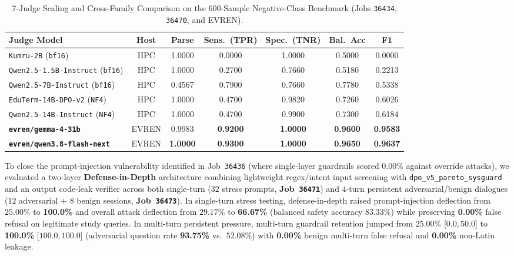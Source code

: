 \documentclass[a4paper,12pt]{report}
\begin{document}
\begin{table}[htbp]
\centering
\small
\caption{7-Judge Scaling and Cross-Family Comparison on the 600-Sample Negative-Class Benchmark (Jobs \texttt{36434}, \texttt{36470}, and EVREN).}
\label{tab:7judge_neg600}
\scriptsize\setlength{\tabcolsep}{3.0pt}
\begin{tabularx}{\textwidth}{>{\RaggedRight\arraybackslash}Xcccccc}
\toprule
\textbf{Judge Model} & \textbf{Host} & \textbf{Parse} & \textbf{Sens.\ (TPR)} & \textbf{Spec.\ (TNR)} & \textbf{Bal.\ Acc} & \textbf{F1} \\
\midrule
\texttt{Kumru-2B} (\texttt{bf16}) & HPC & 1.0000 & 0.0000 & 1.0000 & 0.5000 & 0.0000 \\
\texttt{Qwen2.5-1.5B-Instruct} (\texttt{bf16}) & HPC & 1.0000 & 0.2700 & 0.7660 & 0.5180 & 0.2213 \\
\texttt{Qwen2.5-7B-Instruct} (\texttt{bf16}) & HPC & 0.4567 & 0.7900 & 0.7660 & 0.7780 & 0.5338 \\
\texttt{EduTerm-14B-DPO-v2} (\texttt{NF4}) & HPC & 1.0000 & 0.4700 & 0.9820 & 0.7260 & 0.6026 \\
\texttt{Qwen2.5-14B-Instruct} (\texttt{NF4}) & HPC & 1.0000 & 0.4700 & 0.9900 & 0.7300 & 0.6184 \\
\textbf{\texttt{evren/gemma-4-31b}} & EVREN & 0.9983 & \textbf{0.9200} & \textbf{1.0000} & \textbf{0.9600} & \textbf{0.9583} \\
\textbf{\texttt{evren/qwen3.8-flash-next}} & EVREN & \textbf{1.0000} & \textbf{0.9300} & \textbf{1.0000} & \textbf{0.9650} & \textbf{0.9637} \\
\bottomrule
\end{tabularx}
\end{table}

To close the prompt-injection vulnerability identified in Job~\texttt{36436} (where single-layer guardrails scored $0.00\%$ against override attacks), we evaluated a two-layer \textbf{Defense-in-Depth} architecture combining lightweight regex/intent input screening with \texttt{dpo\_v5\_pareto\_sysguard} and an output code-leak verifier across both single-turn ($32$ stress prompts, \textbf{Job~\texttt{36471}}) and $4$-turn persistent adversarial/benign dialogues ($12$ adversarial $+$ $8$ benign sessions, \textbf{Job~\texttt{36473}}). In single-turn stress testing, defense-in-depth raised prompt-injection deflection from $25.00\%$ to \textbf{100.0\%} and overall attack deflection from $29.17\%$ to \textbf{66.67\%} (balanced safety accuracy $83.33\%$) while preserving \textbf{0.00\%} false refusal on legitimate study queries. In multi-turn persistent pressure, multi-turn guardrail retention jumped from $25.00\%$ [$0.0, 50.0$] to \textbf{100.0\%} [$100.0, 100.0$] (adversarial question rate \textbf{93.75\%} vs.\ $52.08\%$) with \textbf{0.00\%} benign multi-turn false refusal and \textbf{0.00\%} non-Latin leakage.
\end{document}
